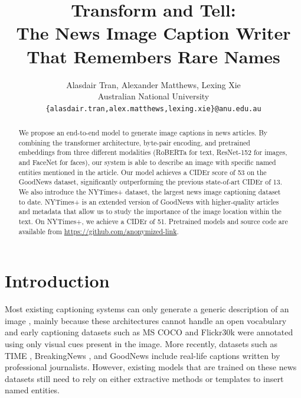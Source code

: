 \documentclass[10pt,twocolumn,letterpaper]{article}
\begin{document}
\title{Transform and Tell:\\The News Image Caption Writer That Remembers Rare Names}

\author{Alasdair Tran, Alexander Matthews, Lexing Xie\\
Australian National University\\
{\tt\small \{alasdair.tran,alex.matthews,lexing.xie\}@anu.edu.au}
}

\maketitle

\begin{abstract}
   We propose an end-to-end model to generate image captions in news articles.
   By combining the transformer architecture, byte-pair encoding, and
   pretrained embeddings from three different modalities (RoBERTa for text,
   ResNet-152 for images, and FaceNet for faces), our system is able to
   describe an image with specific named entities mentioned in the article. Our
   model achieves a CIDEr score of 53 on the GoodNews dataset, significantly
   outperforming the previous state-of-art CIDEr of 13. We also introduce the
   NYTimes+ dataset, the largest news image captioning dataset to date.
   NYTimes+ is an extended version of GoodNews with higher-quality articles and
   metadata that allow us to study the importance of the image location within
   the text. On NYTimes+, we achieve a CIDEr of 51. Pretrained models and
   source code are available from
   \href{https://github.com}{https://github.com/anonymized-link}.
\end{abstract}

\section{Introduction}

Most existing captioning systems can only generate a generic description of an
image \cite{Donahue2015LongTR, Vinyals2015ShowAT, Fang2015FromCT,
Karpathy2015DeepVA, Rennie2017SelfCriticalST, Lu2017KnowingWT,
Anderson2017BottomUpAT, Cornia2019ShowCT}, mainly because these architectures
cannot handle an open vocabulary and early captioning datasets such as MS COCO
\cite{Lin2014MicrosoftCC, Chen2015MicrosoftCC} and Flickr30k
\cite{Young2014FromID} were annotated using only visual cues present in the
image. More recently, datasets such as TIME \cite{Tariq2017ACE}, BreakingNews
\cite{Ramisa2016BreakingNewsAA}, and GoodNews \cite{Biten2019GoodNews} include
real-life captions written by professional journalists. However, existing
models that are trained on these news datasets still need to rely on either
extractive methods or templates to insert named entities.
\end{document}
